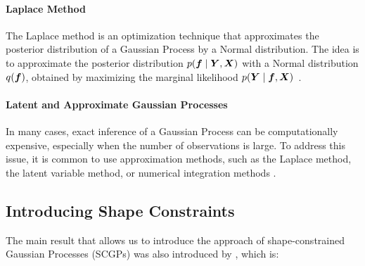 \paragraph{Laplace Method}

The Laplace method is an optimization technique that approximates the posterior distribution of a Gaussian Process by a Normal distribution.
The idea is to approximate the posterior distribution \( p(\boldsymbol{f} \mid \boldsymbol{Y}, \boldsymbol{X}) \) with a Normal distribution \( q(\boldsymbol{f}) \), obtained by maximizing the marginal likelihood \( p(\boldsymbol{Y} \mid \boldsymbol{f}, \boldsymbol{X}) \)~\citep{Riihimaki2013}.

\paragraph{Latent and Approximate Gaussian Processes}

In many cases, exact inference of a Gaussian Process can be computationally expensive, especially when the number of observations is large.
To address this issue, it is common to use approximation methods, such as the Laplace method, the latent variable method, or numerical integration methods \citep{Williams1998}. 


\subsection{Introducing Shape Constraints}
\label{sec:scgp}

The main result that allows us to introduce the approach of shape-constrained Gaussian Processes (SCGPs) was also introduced by \cite{Rasmussen2005}, which is:


